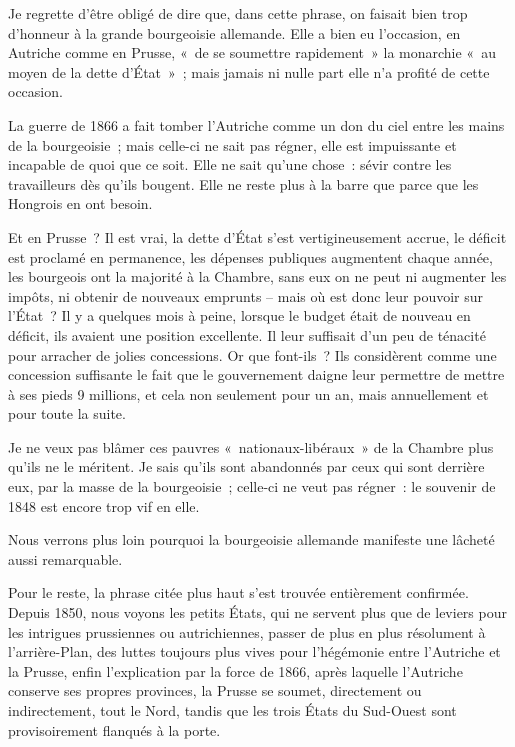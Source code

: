 \documentclass[french,twoside]{book} %
\begin{document}
\noindent Je regrette d’être obligé de dire que, dans cette phrase, on faisait bien trop d’honneur à la grande bourgeoisie allemande. Elle a bien eu l’occasion, en Autriche comme en Prusse, « de se soumettre rapidement » la monarchie « au moyen de la dette d’État » ; mais jamais ni nulle part elle n’a profité de cette occasion.\par
La guerre de 1866 a fait tomber l’Autriche comme un don du ciel entre les mains de la bourgeoisie ; mais celle-ci ne sait pas régner, elle est impuissante et incapable de quoi que ce soit. Elle ne sait qu’une chose : sévir contre les travailleurs dès qu’ils bougent. Elle ne reste plus à la barre que parce que les Hongrois en ont besoin.\par
Et en Prusse ? Il est vrai, la dette d’État s’est vertigineusement accrue, le déficit est proclamé en permanence, les dépenses publiques augmentent chaque année, les bourgeois ont la majorité à la Chambre, sans eux on ne peut ni augmenter les impôts, ni obtenir de nouveaux emprunts – mais où est donc leur pouvoir sur l’État ? Il y a quelques mois à peine, lorsque le budget était de nouveau en déficit, ils avaient une position excellente. Il leur suffisait d’un peu de ténacité pour arracher de jolies concessions. Or que font-ils ? Ils considèrent comme une concession suffisante le fait que le gouvernement daigne leur permettre de mettre à ses pieds 9 millions, et cela non seulement pour un an, mais annuellement et pour toute la suite.\par
Je ne veux pas blâmer ces pauvres « nationaux-libéraux » de la Chambre plus qu’ils ne le méritent. Je sais qu’ils sont abandonnés par ceux qui sont derrière eux, par la masse de la bourgeoisie ; celle-ci ne veut pas régner : le souvenir de 1848 est encore trop vif en elle.\par
Nous verrons plus loin pourquoi la bourgeoisie allemande manifeste une lâcheté aussi remarquable.\par
Pour le reste, la phrase citée plus haut s’est trouvée entièrement confirmée. Depuis 1850, nous voyons les petits États, qui ne servent plus que de leviers pour les intrigues prussiennes ou autrichiennes, passer de plus en plus résolument à l’arrière-Plan, des luttes toujours plus vives pour l’hégémonie entre l’Autriche et la Prusse, enfin l’explication par la force de 1866, après laquelle l’Autriche conserve ses propres provinces, la Prusse se soumet, directement ou indirectement, tout le Nord, tandis que les trois États du Sud-Ouest sont provisoirement flanqués à la porte.\par
\end{document}
